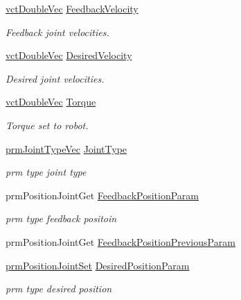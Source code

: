 \begin{DoxyCompactItemize}
\hyperlink{vct_dynamic_vector_types_8h_ade4b3068c86fb88f41af2e5187e491c2}{vct\+Double\+Vec} \hyperlink{classmts_p_i_d_ad881aba30dc205f26ce1ce69763bf9a6}{Feedback\+Velocity}
\begin{DoxyCompactList}\small\item\em Feedback joint velocities. \end{DoxyCompactList}\item 
\hyperlink{vct_dynamic_vector_types_8h_ade4b3068c86fb88f41af2e5187e491c2}{vct\+Double\+Vec} \hyperlink{classmts_p_i_d_aacc1516bf1b22d2c0e0b184fe7928b42}{Desired\+Velocity}
\begin{DoxyCompactList}\small\item\em Desired joint velocities. \end{DoxyCompactList}\item 
\hyperlink{vct_dynamic_vector_types_8h_ade4b3068c86fb88f41af2e5187e491c2}{vct\+Double\+Vec} \hyperlink{classmts_p_i_d_a928a19f9bc0b311ec5743a108b2f8534}{Torque}
\begin{DoxyCompactList}\small\item\em Torque set to robot. \end{DoxyCompactList}\item 
\hyperlink{prm_joint_type_8h_a3a21392b4484e2e24aa0b73d553f940e}{prm\+Joint\+Type\+Vec} \hyperlink{classmts_p_i_d_ae108b12c62723774cee553f7e76213f6}{Joint\+Type}
\begin{DoxyCompactList}\small\item\em prm type joint type \end{DoxyCompactList}\item 
prm\+Position\+Joint\+Get \hyperlink{classmts_p_i_d_ab504e84dce2591651f13dde667e34497}{Feedback\+Position\+Param}
\begin{DoxyCompactList}\small\item\em prm type feedback positoin \end{DoxyCompactList}\item 
prm\+Position\+Joint\+Get \hyperlink{classmts_p_i_d_a28b48c75d2a18ae085e903a4d2668527}{Feedback\+Position\+Previous\+Param}
\item 
\hyperlink{classprm_position_joint_set}{prm\+Position\+Joint\+Set} \hyperlink{classmts_p_i_d_a7ef37febb5f1248dcccfa6a0e857b7a9}{Desired\+Position\+Param}
\begin{DoxyCompactList}\small\item\em prm type desired position \end{DoxyCompactList}\item 

\end{DoxyCompactItemize}
